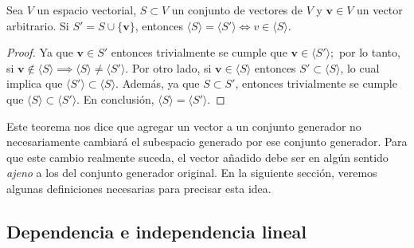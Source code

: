 \documentclass[12pt,dvipsnames]{article}
\newenvironment{teorema}[2][Teorema]{\begin{trivlist}
\item[\hskip \labelsep {\bfseries #1}\hskip \labelsep {\bfseries #2.}]}{\end{trivlist}}
\begin{document}
\begin{teorema} {3.2.1} 
Sea $V$ un espacio vectorial, $S\subset V$ un conjunto de vectores de $V$ y $\mathbf{v}\in V$ un vector arbitrario. Si $S'=S\cup\{\mathbf{v}\}$, entonces $\langle S \rangle = \langle S' \rangle \iff v\in\langle S \rangle.$

\begin{proof}
Ya que $\mathbf{v}\in S'$ entonces trivialmente se cumple que $\mathbf{v}\in\langle S'\rangle;$ por lo tanto, si $\mathbf{v}\notin \langle S \rangle \implies \langle S \rangle \neq \langle S' \rangle.$ Por otro lado, si $\mathbf{v}\in\langle S \rangle$ entonces $S'\subset\langle S \rangle$, lo cual implica que $\langle S' \rangle \subset \langle S \rangle.$ Además, ya que $S\subset S'$, entonces trivialmente se cumple que $\langle S \rangle \subset \langle S' \rangle.$ En conclusión, $\langle S \rangle =\langle S' \rangle.$
\end{proof}
        
    Este teorema nos dice que agregar un vector a un conjunto generador no necesariamente cambiará el subespacio generado por ese conjunto generador. Para que este cambio realmente suceda, el vector añadido debe ser en algún sentido \emph{ajeno} a los del conjunto generador original. En la siguiente sección, veremos algunas definiciones necesarias para precisar esta idea.

\end{teorema}

\newpage
\subsection{Dependencia e independencia lineal} \label{Subsec:Dependencia_e_independencia_lineal}
\end{document}
